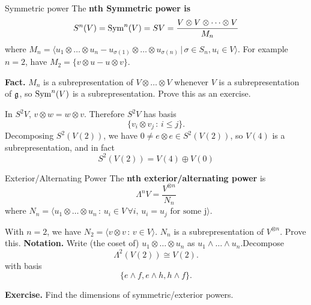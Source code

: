 \documentclass{article}
\begin{document}
\begin{fancydefine}{Symmetric power}
    The \textbf{nth Symmetric power is} \[ S^{n}(V) = \operatorname{Sym}^{n}(V)=SV= \frac{V \otimes V \otimes \dots \otimes V}{M_{n}}\] where $M_{n}=\langle u_{1} \otimes \dots \otimes u_{n} - u_{\sigma(1)} \otimes \dots \otimes u_{\sigma(n)} \, | \, \sigma \in S_{n}, u_{i} \in V \rangle$. \gap For example $n=2$, have $M_{2}=\{v\otimes u - u \otimes v\}$.
\end{fancydefine}
\textbf{Fact. } $M_{n}$ is a subrepresentation of $V \otimes \dots \otimes V$ whenever $V$ is a subrepresentation of $\mathfrak{g}$, so $\operatorname{Sym}^{n}(V)$ is a subrepresentation. Prove this as an exercise.
\begin{ex}
    In $S^{2}V$, $v \otimes w = w \otimes v$. Therefore $S^{2}V$ has basis \[ \{v_{i} \otimes  v_{j} \, : \, i\leq j\}.\] Decomposing $S^{2}(V(2))$, we have $0 \neq e \otimes e \in S^{2}(V(2))$, so $V(4)$ is a subrepresentation, and in fact \[S^{2}(V(2)) = V(4) \oplus V(0)\]
\end{ex}
\begin{fancydefine}{Exterior/Alternating Power}
    The \textbf{nth exterior/alternating power} is \[\Lambda^{n} V = \frac{V^{\otimes n}}{N_{n}}\] where $N_{n} = \langle u_{1} \otimes \dots \otimes u_{n} \, : \, u_{i} \in V \, \forall i, \, u_{i}=u_{j} \text{ for some j} \rangle$.
\end{fancydefine}
\begin{ex} With $n=2$, we have $N_{2} = \langle v \otimes v \, : \, v \in V \rangle$. $N_{n}$ is a subrepresentation of $V^{\otimes n}$. Prove this. \gap \textbf{Notation. } Write (the coset of) $u_{1} \otimes \dots \otimes u_{n}$ as $u_{1} \wedge \dots \wedge u_{n}$.\gap Decompose \[ \Lambda^{2}(V(2)) \cong V(2). \] with basis \[ \{e \wedge f, e \wedge h, h \wedge f\}.\] 
\end{ex}
\textbf{Exercise. } Find the dimensions of symmetric/exterior powers.
\end{document}
